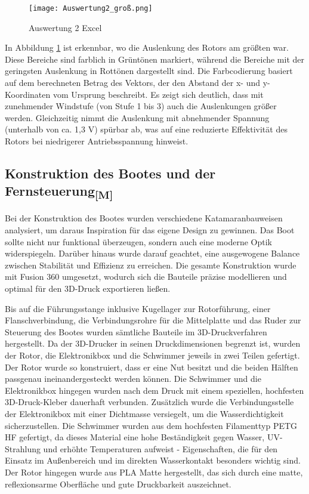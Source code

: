 \documentclass[a4paper,12pt]{article}
\begin{document}
\begin{figure}[H]
    \centering
    \texttt{[image: Auswertung2\_groß.png]}
    \caption{Auswertung 2 Excel}
    \label{fig:Auswertung 2 Excel}
\end{figure}

In Abbildung \ref{fig:Auswertung 2 Excel} ist erkennbar, wo die Auslenkung des Rotors am größten war. Diese Bereiche sind farblich in Grüntönen markiert, während die Bereiche mit der geringsten Auslenkung in Rottönen dargestellt sind. Die Farbcodierung basiert auf dem berechneten Betrag des Vektors, der den Abstand der x- und y-Koordinaten vom Ursprung beschreibt.
Es zeigt sich deutlich, dass mit zunehmender Windstufe (von Stufe 1 bis 3) auch die Auslenkungen größer werden. Gleichzeitig nimmt die Auslenkung mit abnehmender Spannung (unterhalb von ca. 1,3 V) spürbar ab, was auf eine reduzierte Effektivität des Rotors bei niedrigerer Antriebsspannung hinweist. 

\newpage

\subsection{\texorpdfstring{Konstruktion des Bootes und der Fernsteuerung\textsubscript{[M]}}{Konstruktion des Bootes und der Fernsteuerung [M]}}

Bei der Konstruktion des Bootes wurden verschiedene Katamaranbauweisen analysiert, um daraus Inspiration für das eigene Design zu gewinnen. Das Boot sollte nicht nur funktional überzeugen, sondern auch eine moderne Optik widerspiegeln. Darüber hinaus wurde darauf geachtet, eine ausgewogene Balance zwischen Stabilität und Effizienz zu erreichen. Die gesamte Konstruktion wurde mit Fusion 360 umgesetzt, wodurch sich die Bauteile präzise modellieren und optimal für den 3D-Druck exportieren ließen.\newline

Bis auf die Führungsstange inklusive Kugellager zur Rotorführung, einer Flanschverbindung, die Verbindungsrohre für die Mittelplatte und das Ruder zur Steuerung des Bootes wurden sämtliche Bauteile im 3D-Druckverfahren hergestellt. Da der 3D-Drucker in seinen Druckdimensionen begrenzt ist, wurden der Rotor, die Elektronikbox und die Schwimmer jeweils in zwei Teilen gefertigt. Der Rotor wurde so konstruiert, dass er eine Nut besitzt und die beiden Hälften passgenau ineinandergesteckt werden können. Die Schwimmer und die Elektronikbox hingegen wurden nach dem Druck mit einem speziellen, hochfesten 3D-Druck-Kleber dauerhaft verbunden. Zusätzlich wurde die Verbindungsstelle der Elektronikbox mit einer Dichtmasse versiegelt, um die Wasserdichtigkeit sicherzustellen. Die Schwimmer wurden aus dem hochfesten Filamenttyp PETG HF gefertigt, da dieses Material eine hohe Beständigkeit gegen Wasser, UV-Strahlung und erhöhte Temperaturen aufweist - Eigenschaften, die für den Einsatz im Außenbereich und im direkten Wasserkontakt besonders wichtig sind. Der Rotor hingegen wurde aus PLA Matte hergestellt, das sich durch eine matte, reflexionsarme Oberfläche und gute Druckbarkeit auszeichnet.\newline
\end{document}
